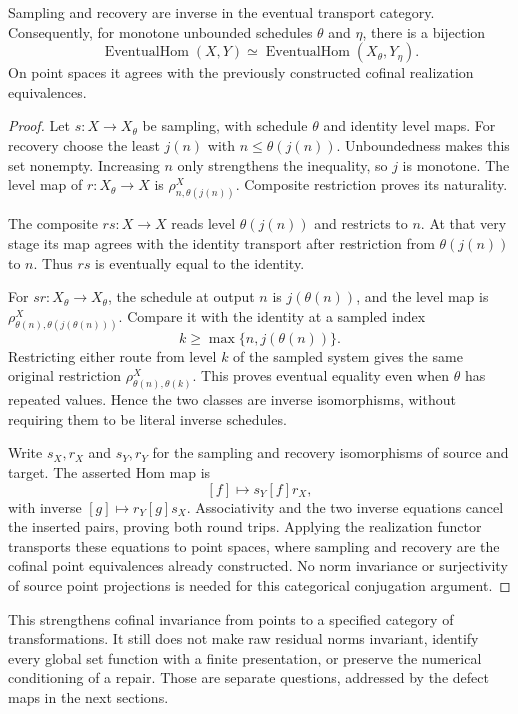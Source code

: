 \begin{KStheorem}\label{KS:KS64}
Sampling and recovery are inverse in the eventual transport category. Consequently, for monotone unbounded schedules \(\theta\) and \(\eta\), there is a bijection
\[
 \operatorname{EventualHom}(X,Y)
 \simeq
 \operatorname{EventualHom}(X_\theta,Y_\eta).
\]
On point spaces it agrees with the previously constructed cofinal realization equivalences.
\end{KStheorem}
\begin{proof}
Let \(s:X\to X_\theta\) be sampling, with schedule \(\theta\) and identity level maps. For recovery choose the least \(j(n)\) with \(n\le\theta(j(n))\). Unboundedness makes this set nonempty. Increasing \(n\) only strengthens the inequality, so \(j\) is monotone. The level map of \(r:X_\theta\to X\) is \(\rho^X_{n,\theta(j(n))}\). Composite restriction proves its naturality.

The composite \(rs:X\to X\) reads level \(\theta(j(n))\) and restricts to \(n\). At that very stage its map agrees with the identity transport after restriction from \(\theta(j(n))\) to \(n\). Thus \(rs\) is eventually equal to the identity.

For \(sr:X_\theta\to X_\theta\), the schedule at output \(n\) is \(j(\theta(n))\), and the level map is \(\rho^X_{\theta(n),\theta(j(\theta(n)))}\). Compare it with the identity at a sampled index
\[
 k\ge\max\{n,j(\theta(n))\}.
\]
Restricting either route from level \(k\) of the sampled system gives the same original restriction \(\rho^X_{\theta(n),\theta(k)}\). This proves eventual equality even when \(\theta\) has repeated values. Hence the two classes are inverse isomorphisms, without requiring them to be literal inverse schedules.

Write \(s_X,r_X\) and \(s_Y,r_Y\) for the sampling and recovery isomorphisms of source and target. The asserted Hom map is
\[
 [f]\longmapsto s_Y[f]r_X,
\]
with inverse \([g]\mapsto r_Y[g]s_X\). Associativity and the two inverse equations cancel the inserted pairs, proving both round trips. Applying the realization functor transports these equations to point spaces, where sampling and recovery are the cofinal point equivalences already constructed. No norm invariance or surjectivity of source point projections is needed for this categorical conjugation argument.
\end{proof}
This strengthens cofinal invariance from points to a specified category of transformations. It still does not make raw residual norms invariant, identify every global set function with a finite presentation, or preserve the numerical conditioning of a repair. Those are separate questions, addressed by the defect maps in the next sections.

